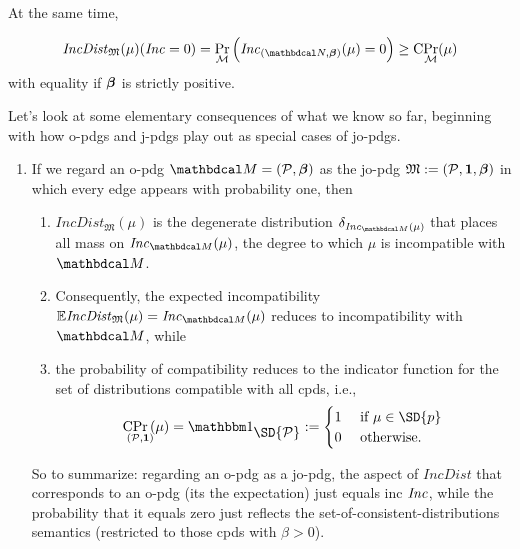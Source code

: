 \documentclass{article}
\newcommand\IncD{\mathit{IncDist}}
\begin{document}
At the same time, 
\begin{prop}
    \begin{align*}
        \IncD_{\mathfrak M}(\mu)(\Inc = 0) = 
        \Pr_{\mathcal M}\Big( \Inc_{(\dg N,\bbeta)}(\mu) = 0\Big)
        \ge
        \mathrm{C}\!\Pr_{\mathcal M}(\mu) 
    \end{align*}
    with equality if $\boldsymbol\beta$ is strictly positive.
\end{prop}


Let's look at some elementary consequences of what we know so far, beginning with how o-pdgs and j-pdgs play out as special cases of jo-pdgs.
\begin{enumerate}
    \item If we regard an o-pdg $\dg M = (\mathcal P, \bbeta)$ as the jo-pdg $\mathfrak M := (\mathcal P, \mathbf{1}, \boldsymbol\beta)$ in which every edge appears with probability one, then 
    \begin{enumerate}
        \item  $\IncD_{\mathfrak M}(\mu)$ is the degenerate distribution $\delta_{\Inc_{\dg M}(\mu)}$ that places all mass on $\Inc_{\dg M}(\mu)$, the degree to which $\mu$ is incompatible with $\dg M$. 
        \item Consequently, the expected incompatibility $\Ex\!\IncD_{\mathfrak M}(\mu) = \Inc_{\dg M}(\mu)$ reduces to incompatibility with $\dg M$, while
        \item the probability of compatibility reduces to the indicator function for the set of distributions compatible with all cpds, i.e., 
        \[
            \mathrm{C}\!\Pr_{\mathclap{(\mathcal P, \mat 1)}}\,(\mu) = \mathbbm1_{\textstyle\SD{\mathcal P}}
            := \begin{cases}
                1 & \text { if }\mu \in \SD{p} \\ 0 & \text{ otherwise.}
            \end{cases}
        \]
    \end{enumerate}
    
    So to summarize: regarding an o-pdg as a jo-pdg, the aspect of $\IncD$ that corresponds to an o-pdg (its the expectation) just equals inc $\mathit{Inc}$, while the probability that it equals zero just reflects the set-of-consistent-distributions semantics (restricted to those cpds with $\beta > 0$).
    

\end{enumerate}
\end{document}
